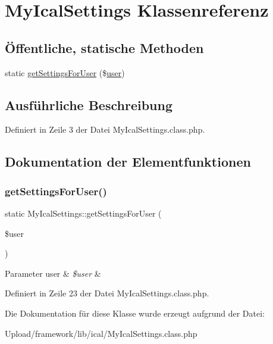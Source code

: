 \hypertarget{class_my_ical_settings}{}\section{My\+Ical\+Settings Klassenreferenz}
\label{class_my_ical_settings}
\subsection*{Öffentliche, statische Methoden}
\begin{DoxyCompactItemize}
\item 
static \mbox{\hyperlink{class_my_ical_settings_a4ec3e44653b088adb8aaff83d24aac97}{get\+Settings\+For\+User}} (\$\mbox{\hyperlink{classuser}{user}})
\end{DoxyCompactItemize}


\subsection{Ausführliche Beschreibung}


Definiert in Zeile 3 der Datei My\+Ical\+Settings.\+class.\+php.



\subsection{Dokumentation der Elementfunktionen}
\mbox{\label{class_my_ical_settings_a4ec3e44653b088adb8aaff83d24aac97}} 
\subsubsection{\texorpdfstring{get\+Settings\+For\+User()}{getSettingsForUser()}}
{\footnotesize\ttfamily static My\+Ical\+Settings\+::get\+Settings\+For\+User (\begin{DoxyParamCaption}\item[{}]{\$user }\end{DoxyParamCaption})\hspace{0.3cm}{\ttfamily [static]}}


\begin{DoxyParams}[1]{Parameter}
user & {\em \$user} & \\
\hline
\end{DoxyParams}


Definiert in Zeile 23 der Datei My\+Ical\+Settings.\+class.\+php.



Die Dokumentation für diese Klasse wurde erzeugt aufgrund der Datei\+:\begin{DoxyCompactItemize}
\item 
Upload/framework/lib/ical/My\+Ical\+Settings.\+class.\+php\end{DoxyCompactItemize}
